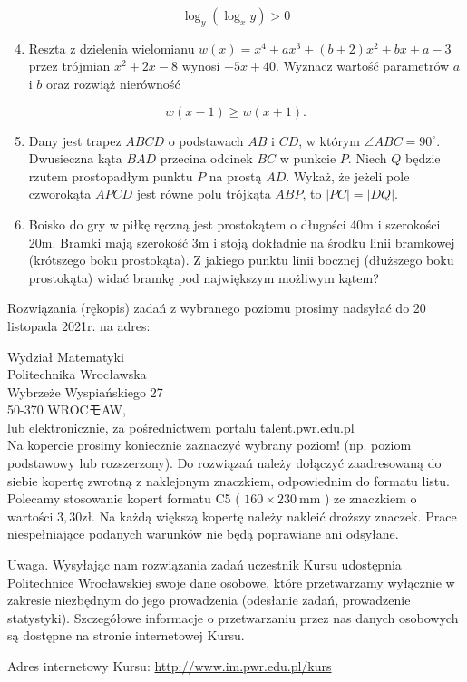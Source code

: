 \documentclass[10pt]{article}
\begin{document}
$$
\log _{y}\left(\log _{x} y\right)>0
$$

\begin{enumerate}
  \setcounter{enumi}{3}
  \item Reszta z dzielenia wielomianu $w(x)=x^{4}+a x^{3}+(b+2) x^{2}+b x+a-3$ przez trójmian $x^{2}+2 x-8$ wynosi $-5 x+40$. Wyznacz wartość parametrów $a$ i $b$ oraz rozwiąż nierówność
\end{enumerate}

$$
w(x-1) \geqslant w(x+1) .
$$

\begin{enumerate}
  \setcounter{enumi}{4}
  \item Dany jest trapez $A B C D$ o podstawach $A B$ i $C D$, w którym $\angle A B C=90^{\circ}$. Dwusieczna kąta $B A D$ przecina odcinek $B C$ w punkcie $P$. Niech $Q$ będzie rzutem prostopadłym punktu $P$ na prostą $A D$. Wykaż, że jeżeli pole czworokąta $A P C D$ jest równe polu trójkąta $A B P$, to $|P C|=|D Q|$.
  \item Boisko do gry w piłkę ręczną jest prostokątem o długości 40m i szerokości 20m. Bramki mają szerokość 3m i stoją dokładnie na środku linii bramkowej (krótszego boku prostokąta). Z jakiego punktu linii bocznej (dłuższego boku prostokąta) widać bramkę pod największym możliwym kątem?
\end{enumerate}

Rozwiązania (rękopis) zadań z wybranego poziomu prosimy nadsyłać do 20 listopada 2021r. na adres:

Wydział Matematyki\\
Politechnika Wrocławska\\
Wybrzeże Wyspiańskiego 27\\
50-370 WROCモAW,\\
lub elektronicznie, za pośrednictwem portalu \href{http://talent.pwr.edu.pl}{talent.pwr.edu.pl}\\
Na kopercie prosimy koniecznie zaznaczyć wybrany poziom! (np. poziom podstawowy lub rozszerzony). Do rozwiązań należy dołączyć zaadresowaną do siebie kopertę zwrotną z naklejonym znaczkiem, odpowiednim do formatu listu. Polecamy stosowanie kopert formatu C5 ( $160 \times 230 \mathrm{~mm}$ ) ze znaczkiem o wartości $3,30 \mathrm{zł}$. Na każdą większą kopertę należy nakleić droższy znaczek. Prace niespełniające podanych warunków nie będą poprawiane ani odsyłane.

Uwaga. Wysyłając nam rozwiązania zadań uczestnik Kursu udostępnia Politechnice Wrocławskiej swoje dane osobowe, które przetwarzamy wyłącznie w zakresie niezbędnym do jego prowadzenia (odesłanie zadań, prowadzenie statystyki). Szczegółowe informacje o przetwarzaniu przez nas danych osobowych są dostępne na stronie internetowej Kursu.

Adres internetowy Kursu: \href{http://www.im.pwr.edu.pl/kurs}{http://www.im.pwr.edu.pl/kurs}
\end{document}
